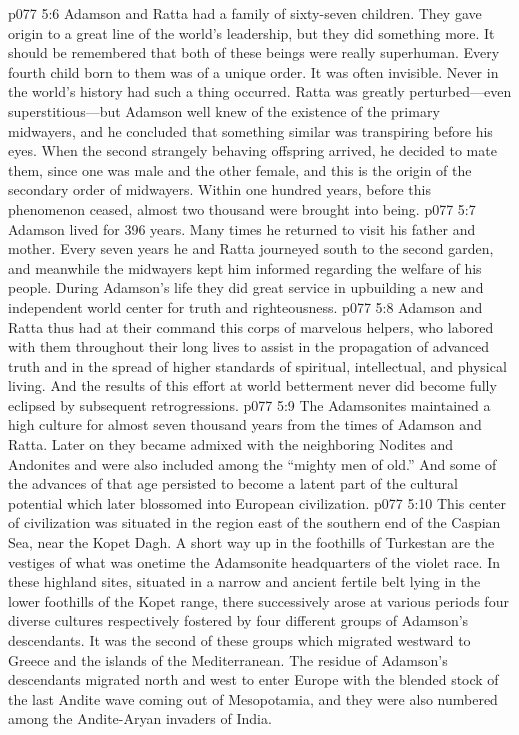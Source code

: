 \pc \vs p077 5:6 Adamson and Ratta had a family of sixty\hyp{}seven children. They gave origin to a great line of the world’s leadership, but they did something more. It should be remembered that both of these beings were really superhuman. Every fourth child born to them was of a unique order. It was often invisible. Never in the world’s history had such a thing occurred. Ratta was greatly perturbed---even superstitious---but Adamson well knew of the existence of the primary midwayers, and he concluded that something similar was transpiring before his eyes. When the second strangely behaving offspring arrived, he decided to mate them, since one was male and the other female, and this is the origin of the secondary order of midwayers. Within one hundred years, before this phenomenon ceased, almost two thousand were brought into being.
\pc \vs p077 5:7 Adamson lived for 396 years. Many times he returned to visit his father and mother. Every seven years he and Ratta journeyed south to the second garden, and meanwhile the midwayers kept him informed regarding the welfare of his people. During Adamson’s life they did great service in upbuilding a new and independent world center for truth and righteousness.
\vs p077 5:8 Adamson and Ratta thus had at their command this corps of marvelous helpers, who labored with them throughout their long lives to assist in the propagation of advanced truth and in the spread of higher standards of spiritual, intellectual, and physical living. And the results of this effort at world betterment never did become fully eclipsed by subsequent retrogressions.\plusone
\pc \vs p077 5:9 The Adamsonites maintained a high culture for almost seven thousand years from the times of Adamson and Ratta. Later on they became admixed with the neighboring Nodites and Andonites and were also included among the “mighty men of old.” And some of the advances of that age persisted to become a latent part of the cultural potential which later blossomed into European civilization.
\vs p077 5:10 This center of civilization was situated in the region east of the southern end of the Caspian Sea, near the Kopet Dagh. A short way up in the foothills of Turkestan are the vestiges of what was onetime the Adamsonite headquarters of the violet race. In these highland sites, situated in a narrow and ancient fertile belt lying in the lower foothills of the Kopet range, there successively arose at various periods four diverse cultures respectively fostered by four different groups of Adamson’s descendants. It was the second of these groups which migrated westward to Greece and the islands of the Mediterranean. The residue of Adamson’s descendants migrated north and west to enter Europe with the blended stock of the last Andite wave coming out of Mesopotamia, and they were also numbered among the Andite\hyp{}Aryan invaders of India.
